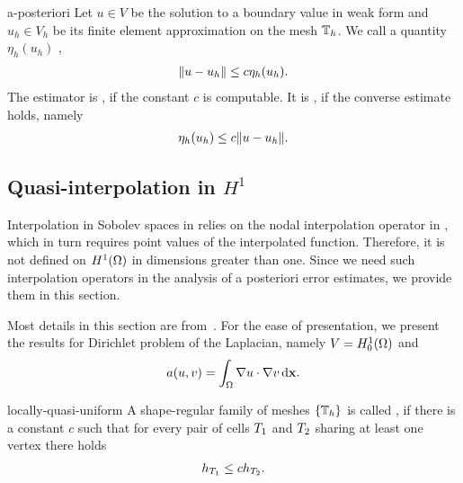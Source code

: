 \begin{Definition}{a-posteriori}
  Let $u\in V$ be the solution to a boundary value in weak form and
  $u_h\in V_h$ be its finite element approximation on the mesh
  $\mathbb T_h$. We call a quantity $\eta_h(u_h)$ ,
  \begin{gather}
    \lVert u-u_h\rVert \le c \eta_h(u_h).
  \end{gather}
  The estimator is , if the constant $c$ is
  computable. It is , if the converse estimate holds,
  namely
  \begin{gather}
    \eta_h(u_h) \le c \lVert u-u_h\rVert.
  \end{gather}
\end{Definition}

\subsection{Quasi-interpolation in $H^1$}

\begin{intro}
  Interpolation in Sobolev spaces in
   relies on the nodal
  interpolation operator in
  , which in turn requires
  point values of the interpolated function. Therefore, it is not
  defined on $H^1(\Omega)$ in dimensions greater than one. Since we
  need such interpolation operators in the analysis of a posteriori
  error estimates, we provide them in this section.
  
  Most details in this section are from~\cite{Verfuerth13}. For the
  ease of presentation, we present the results for Dirichlet problem
  of the Laplacian, namely $V = H^1_0(\Omega)$ and
  \begin{gather*}
    a(u,v) = \int_\Omega \nabla u\cdot\nabla v\,\mathrm{d} \mathbf x.
  \end{gather*}
\end{intro}

\begin{Definition}{locally-quasi-uniform}
  A shape-regular family of meshes $\{\mathbb T_h\}$ is called
  , if there is a constant $c$ such that
  for every pair of cells $T_1$ and $T_2$ sharing at least one
  vertex there holds
  \begin{gather}
    h_{T_1} \le c h_{T_2}.
  \end{gather}
\end{Definition}

